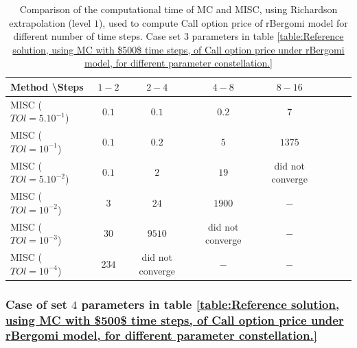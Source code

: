\documentclass[11pt]{article}
\begin{document}
\begin{table}[h!]
	\centering
	\begin{tabular}{l*{6}{c}r}
		Method \textbackslash  Steps            & $1-2$ & $2-4$ & $4-8$ & $8-16$ &   \\
		\hline
		MISC ($TOl=5.10^{-1}$)  & $0.1$ & $0.1$ & $0.2$ & $7$  \\
		MISC ($TOl=10^{-1}$)  & $0.1$ & $0.2$ & $5$ & $1375$  \\
		MISC ($TOl=5.10^{-2}$)  & $0.1$ & $2$ & $19$ & did not converge \\
		MISC ($TOl=10^{-2}$)  & $3$ & $24$ & $1900$ & $-$  \\	
		MISC ($TOl=10^{-3}$)  & $30$ & $9510$ &did not converge & $-$  \\	
		MISC ($TOl=10^{-4}$)  & $234$ &did not converge & $-$ & $-$  \\	
		\hline
	\end{tabular}
	\caption{Comparison of the computational time of  MC and MISC, using Richardson extrapolation (level $1$), used to compute Call option price of rBergomi model for different number of time steps. Case set $3$ parameters in table \ref{table:Reference solution, using MC with $500$ time steps, of Call option price under rBergomi model, for different parameter constellation.}}
	\label{Comparsion of the computational time of  MC and MISC, using Richardson extrapolation (level $1$), used to compute Call option price of rBergomi model for different number of time steps. Case set $3$ parameters}
\end{table}

\FloatBarrier

\subsubsection{Case of set $4$ parameters in table \ref{table:Reference solution, using MC with $500$ time steps, of Call option price under rBergomi model, for different parameter constellation.}}\label{sec:Case of set 4 parameters}
\end{document}
